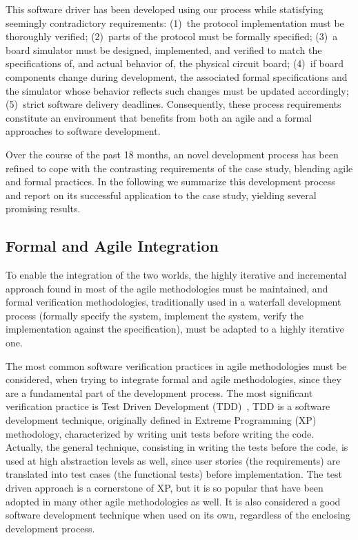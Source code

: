 \documentclass[english]{lni}
\begin{document}
This software driver has been developed using our process while
statisfying seemingly contradictory requirements: (1)~the protocol
implementation must be thoroughly verified; (2)~parts of the protocol
must be formally specified; (3)~a board simulator must be designed,
implemented, and verified to match the specifications of, and actual
behavior of, the physical circuit board; (4)~if board components
change during development, the associated formal specifications and
the simulator whose behavior reflects such changes must be updated
accordingly; (5)~strict software delivery deadlines.  Consequently,
these process requirements constitute an environment that benefits
from both an agile and a formal approaches to software development.

Over the course of the past 18 months, an novel development process
has been refined to cope with the contrasting requirements of the case
study, blending agile and formal practices.  In the following we
summarize this development process and report on its successful
application to the case study, yielding several promising results.

\subsection{Formal and Agile Integration}
\label{subsec:formal_and_agile_integration}

To enable the integration of the two worlds, the highly iterative and incremental approach found in most of the agile methodologies must be maintained, and formal verification  methodologies, traditionally used in a waterfall development process (formally specify the system, implement the system, verify the implementation against the specification), must be adapted to a highly iterative one.

The most common software verification practices in agile methodologies must be considered, when trying to integrate formal and agile methodologies, since they are a fundamental part of the development process. 
The most significant verification practice is Test Driven Development (TDD)~\cite{Beck2003}, TDD is a software development technique, originally defined in Extreme Programming (XP)~\cite{Beck2004} methodology, characterized by writing unit tests before writing the code.
Actually, the general technique, consisting in writing the tests before the code, is used at high abstraction levels as well, since user stories (the requirements) are translated into test cases (the functional tests) before implementation.
The test driven approach is a cornerstone of XP, but it is so popular that have been adopted in many other agile methodologies as well.
It is also considered a good software development technique when used on its own, regardless of the enclosing development process.
\end{document}
